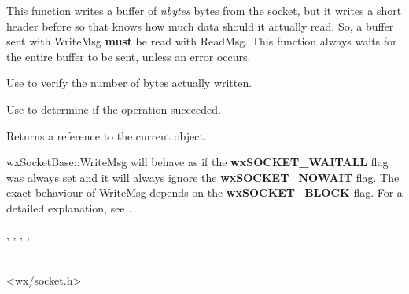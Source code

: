 This function writes a buffer of {\it nbytes} bytes from the socket, but it
writes a short header before so that 
knows how much data should it actually read. So, a buffer sent with WriteMsg
{\bf must} be read with ReadMsg. This function always waits for the entire
buffer to be sent, unless an error occurs.

Use  to verify the number of bytes actually written.

Use  to determine if the operation succeeded.





Returns a reference to the current object.


wxSocketBase::WriteMsg will behave as if the {\bf wxSOCKET\_WAITALL} flag
was always set and it will always ignore the {\bf wxSOCKET\_NOWAIT} flag.
The exact behaviour of WriteMsg depends on the {\bf wxSOCKET\_BLOCK} flag.
For a detailed explanation, see .


, 
, 
, 
, 



\section{}\label{wxsocketclient}




<wx/socket.h>

%
%

